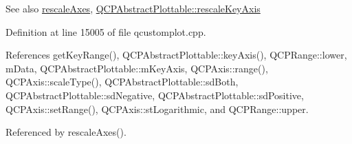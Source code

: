 \begin{DoxySeeAlso}{See also}
\hyperlink{class_q_c_p_graph_aa35b75b9032800d783df749c8a004ee9}{rescale\+Axes}, \hyperlink{class_q_c_p_abstract_plottable_a1acecfcca3e7fcda00fcbaa3c886386f}{Q\+C\+P\+Abstract\+Plottable\+::rescale\+Key\+Axis} 
\end{DoxySeeAlso}


Definition at line 15005 of file qcustomplot.\+cpp.



References get\+Key\+Range(), Q\+C\+P\+Abstract\+Plottable\+::key\+Axis(), Q\+C\+P\+Range\+::lower, m\+Data, Q\+C\+P\+Abstract\+Plottable\+::m\+Key\+Axis, Q\+C\+P\+Axis\+::range(), Q\+C\+P\+Axis\+::scale\+Type(), Q\+C\+P\+Abstract\+Plottable\+::sd\+Both, Q\+C\+P\+Abstract\+Plottable\+::sd\+Negative, Q\+C\+P\+Abstract\+Plottable\+::sd\+Positive, Q\+C\+P\+Axis\+::set\+Range(), Q\+C\+P\+Axis\+::st\+Logarithmic, and Q\+C\+P\+Range\+::upper.



Referenced by rescale\+Axes().


